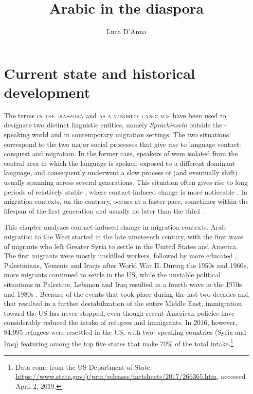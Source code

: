 \documentclass[output=paper]{langsci/langscibook}
\author{Luca D'Anna\affiliation{Università degli Studi di Napoli `L'Orientale'}}
\title{Arabic in the diaspora}
\begin{document}
\maketitle 

\section{Current state and historical development}

The terms \textsc{ in the diaspora} and \textsc{ as a minority language} have been used to designate two distinct linguistic entities, namely  \textit{Sprachinseln} outside the -speaking world and  in contemporary migration settings. The two situations correspond to the two major social processes that give rise to language contact: conquest and migration. In the former case, speakers of  were isolated from the central area in which the  language is spoken, exposed to a different dominant language, and consequently underwent a slow process of  (and eventually shift) usually spanning across several generations. This situation often gives rise to long periods of relatively stable , where contact-induced change is more noticeable \citep[641]{Sankoff2001}. In migration contexts, on the contrary,  occurs at a faster pace, sometimes within the lifespan of the first generation and usually no later than the third \citep[151]{Canagarajah2008}. 

This chapter analyzes contact-induced change in migration contexts. Arab migration to the West started in the late nineteenth century, with the first wave of migrants who left Greater Syria to settle in the United States and  America. The first migrants were mostly  unskilled workers, followed by more educated , Palestinians, Yemenis and Iraqis after World War II. During the 1950s and 1960s, more migrants continued to settle in the US, while the unstable political situations in Palestine, Lebanon and Iraq resulted in a fourth wave in the 1970s and 1980s \citep[17--18]{Rouchdy_introduction_1992}. Because of the events that took place during the last two decades and that resulted in a further destabilization of the entire Middle East, immigration toward the US has never stopped, even though recent American policies have considerably reduced the intake of refugees and immigrants. In 2016, however, 84,995 refugees were resettled in the US, with two -speaking countries (Syria and Iraq) featuring among the top five states that make 70\% of the total intake.\footnote{Data come from the US Department of State. \url{https://www.state.gov/j/prm/releases/factsheets/2017/266365.htm}, accessed April 2, 2019.}
\end{document}
